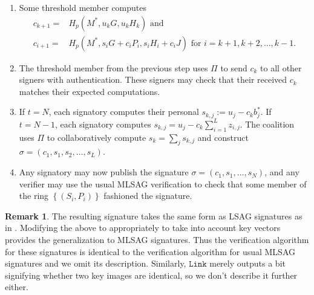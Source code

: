 \documentclass{mrl}
\theoremstyle{definition}
\newtheorem{disc}[theorem]{Remark}
\begin{document}
\begin{enumerate}[(I)]
\begin{enumerate}[(1)]
\item Some threshold member computes 
\begin{align*}
    c_{k+1} =& H_{p}(M^*, u_{k} G, u_{k} H_{k})\text{ and }\\
    c_{i+1} =& H_{p}(M^*, s_i G + c_i P_i, s_i H_{i} + c_i J)\text{ for }i=k+1, k+2, \ldots, k-1.
\end{align*}
\item The threshold member from the previous step uses $\Pi$ to send $c_{k}$ to all other signers with authentication. These signers may check that their received $c_k$ matches their expected computations.
\item If $t=N$, each signatory computes their personal $s_{k,j} := u_j - c_{k} b_j^*$. If $t=N-1$, each signatory computes $s_{k,j} = u_j - c_{k} \sum_{i=1}^{L}z_{i,j}$. The coalition uses $\Pi$ to collaboratively compute $s_k = \sum_j s_{k,j}$ and construct $\sigma = (c_1, s_1, s_2, \ldots, s_L)$.
\item Any signatory may now publish the signature $\sigma=(c_1, s_1, \ldots, s_N)$, and any verifier may use the usual MLSAG verification to check that some member of the ring $\left\{(S_i, P_i)\right\}$ fashioned the signature.
 \end{enumerate}
 \end{enumerate}
 
\begin{disc} The resulting signature takes the same form as LSAG signatures as in \cite{liu2004linkable}. Modifying the above to appropriately to take into account key vectors provides the generalization to MLSAG signatures. Thus the verification algorithm for these signatures is identical to the verification algorithm for usual MLSAG signatures and we omit its description. Similarly, $\texttt{Link}$ merely outputs a bit signifying whether two key images are identical, so we don't describe it further either.

\end{disc}
\end{document}
